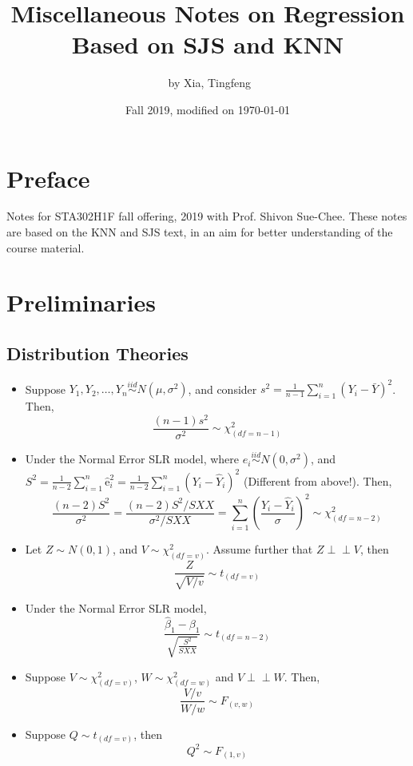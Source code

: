 \documentclass[10pt]{article}
\title{\LARGE{Miscellaneous Notes on Regression}\\ \normalsize{Based on SJS and KNN}}
\author{\ccLogo \,\,by Xia, Tingfeng}
\date{Fall 2019, modified on \today}
\newcommand{\independent}{\perp \!\!\! \perp}
\begin{document}
\maketitle
\section*{Preface}
Notes for STA302H1F fall offering, 2019 with Prof. Shivon Sue-Chee. These notes are based on the KNN and SJS text, in an aim for better understanding of the course material.
\doclicenseThis
\tableofcontents
\newpage

\section{Preliminaries}
\subsection{Distribution Theories}
\begin{itemize}
    \item Suppose $Y_1, Y_2 ,\dots, Y_n \overset{iid}{\sim} N(\mu, \sigma^2)$, and consider $s^{2}=\frac{1}{n-1} \sum_{i=1}^{n}\left(Y_{i}-\bar{Y}\right)^{2}$. Then,
        \begin{equation*}
            \frac{(n-1) s^{2}}{\sigma^{2}} \sim \chi^{2}_{(d f=n-1)}
        \end{equation*}
    \item Under the Normal Error SLR model, where $e_{i} \overset{iid}{\sim} N\left(0, \sigma^{2}\right)$, and $S^{2}=\frac{1}{n-2} \sum_{i=1}^{n} \hat{\mathrm{e}}_{i}^{2}=\frac{1}{n-2} \sum_{i=1}^{n}\left(Y_{i}-\hat{Y}_{i}\right)^{2}$ (Different from above!). Then,
        \begin{equation*}
            \frac{(n-2) S^{2}}{\sigma^{2}}=\frac{(n-2) S^{2} / S X X}{\sigma^{2} / S X X}=\sum_{i=1}^{n}\left(\frac{Y_{i}-\hat{Y}_{i}}{\sigma}\right)^{2} \sim \chi^{2}_{(d f=n-2)}
        \end{equation*}
    \item Let $Z\sim N(0,1)$, and $V\sim \chi^2_{(df=v)}$. Assume further that $Z\independent V$, then
        \begin{equation*}
            \frac{Z}{\sqrt{V / v}} \sim t_{(df=v)}
        \end{equation*}
    \item Under the Normal Error SLR model,
        \begin{equation*}
            \frac{\hat{\beta}_{1}-\beta_{1}}{\sqrt{\frac{S^{2}}{S X X}}} \sim t_{(df = n-2)}
        \end{equation*}
    \item Suppose $V \sim \chi_{(df=v)}^{2}$, $W \sim \chi_{(df=w)}^2$ and $V\independent W$. Then,
        \begin{equation*}
            \frac{V / v}{W / w} \sim F_{(v, w)}
        \end{equation*}
    \item Suppose $Q\sim t_{(df=v)}$, then
        \begin{equation*}
            Q^2 \sim F_{(1,v)}
        \end{equation*}
\end{itemize}
\end{document}
